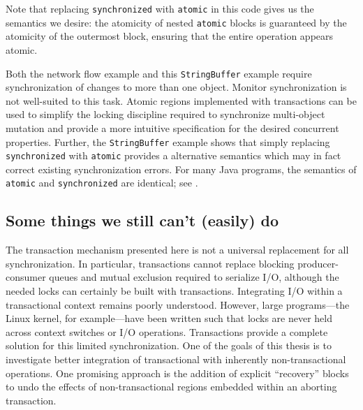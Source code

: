 Note that replacing {\tt synchronized} with {\tt atomic} in
this code gives us the semantics
we desire: the atomicity of nested {\tt atomic} blocks is guaranteed
by the atomicity of the outermost block, ensuring that the entire
operation appears atomic.

Both the network flow example and this {\tt StringBuffer} example require
synchronization of
changes to more than one object.
Monitor synchronization is not
well-suited to this task.  Atomic regions implemented with
transactions can be used to simplify the locking discipline required
to synchronize multi-object mutation
and provide a more intuitive specification for the desired
concurrent properties.  Further, the {\tt StringBuffer} example shows
that simply replacing {\tt synchronized} with {\tt atomic} provides a
alternative semantics which may in fact correct existing
synchronization errors.
For many Java programs, the
semantics of {\tt atomic} and {\tt synchronized} are identical; see
.

\subsection{Some things we still can't (easily) do}\label{sec:xlimit}
The transaction mechanism presented here is not a universal
replacement for all synchronization.  In particular, transactions
cannot replace blocking producer-consumer queues and mutual exclusion
required to serialize I/O, although the needed locks can certainly be
built with transactions.  Integrating I/O within a transactional
context remains poorly understood.  However, large programs---the
Linux kernel, for example---have been written such that locks are
never held across context switches or I/O operations.  Transactions
provide a complete solution for this limited synchronization.
One of the goals of this thesis is to investigate better integration
of transactional with inherently non-transactional operations.
One promising approach is the addition of explicit ``recovery'' blocks
to undo the effects of non-transactional regions embedded within
an aborting transaction.

